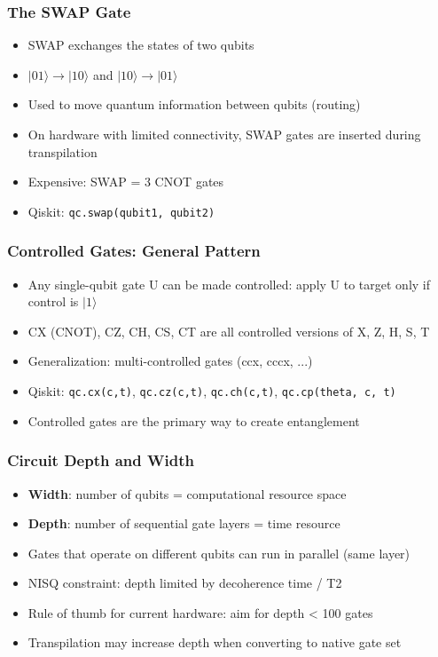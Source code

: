 \begin{frame}[fragile]\frametitle{The SWAP Gate}
\begin{itemize}
\item SWAP exchanges the states of two qubits
\item $|01\rangle \to |10\rangle$ and $|10\rangle \to |01\rangle$
\item Used to move quantum information between qubits (routing)
\item On hardware with limited connectivity, SWAP gates are inserted during transpilation
\item Expensive: SWAP = 3 CNOT gates
\item Qiskit: \texttt{qc.swap(qubit1, qubit2)}
\end{itemize}
\end{frame}

\begin{frame}[fragile]\frametitle{Controlled Gates: General Pattern}
\begin{itemize}
\item Any single-qubit gate U can be made controlled: apply U to target only if control is $|1\rangle$
\item CX (CNOT), CZ, CH, CS, CT are all controlled versions of X, Z, H, S, T
\item Generalization: multi-controlled gates (ccx, cccx, ...)
\item Qiskit: \texttt{qc.cx(c,t)}, \texttt{qc.cz(c,t)}, \texttt{qc.ch(c,t)}, \texttt{qc.cp(theta, c, t)}
\item Controlled gates are the primary way to create entanglement
\end{itemize}
\end{frame}

\begin{frame}[fragile]\frametitle{Circuit Depth and Width}
\begin{itemize}
\item \textbf{Width}: number of qubits = computational resource space
\item \textbf{Depth}: number of sequential gate layers = time resource
\item Gates that operate on different qubits can run in parallel (same layer)
\item NISQ constraint: depth limited by decoherence time / T2
\item Rule of thumb for current hardware: aim for depth < 100 gates
\item Transpilation may increase depth when converting to native gate set
\end{itemize}
\end{frame}

